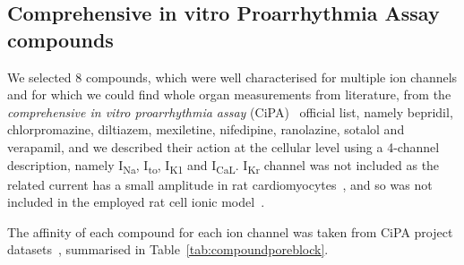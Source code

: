 \subsection{Comprehensive in vitro Proarrhythmia Assay compounds}\label{sec:ch6cipa_compounds}
We selected $8$ compounds, which were well characterised for multiple ion channels and for which we could find whole organ measurements from literature, from the \textit{comprehensive in vitro proarrhythmia assay} (\acs{CiPA})~\cite{Park:2019} official list, namely bepridil, chlorpromazine, diltiazem, mexiletine, nifedipine, ranolazine, sotalol and verapamil, and we described their action at the cellular level using a 4-channel description, namely I\textsubscript{Na}, I\textsubscript{to}, I\textsubscript{K1} and I\textsubscript{CaL}. I\textsubscript{Kr} channel was not included as the related current has a small amplitude in rat cardiomyocytes~\cite{Wymore:1997}, and so was not included in the employed rat cell ionic model~\cite{Gattoni:2017}.

\vspace{0.2cm}
The affinity of each compound for each ion channel was taken from CiPA project datasets~\cite{Li:2018, Li:2019}, summarised in Table~\ref{tab:compoundporeblock}.

